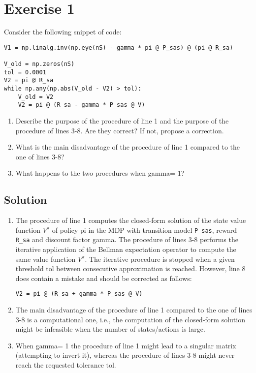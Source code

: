 \section{Exercise 1}

Consider the following snippet of code:
\begin{verbatim}
V1 = np.linalg.inv(np.eye(nS) - gamma * pi @ P_sas) @ (pi @ R_sa)

V_old = np.zeros(nS)
tol = 0.0001
V2 = pi @ R_sa
while np.any(np.abs(V_old - V2) > tol):
    V_old = V2
    V2 = pi @ (R_sa - gamma * P_sas @ V)
\end{verbatim}
\begin{enumerate}
    \item Describe the purpose of the procedure of line 1 and the purpose of the procedure of lines 3-8. 
        Are they correct? 
        If not, propose a correction.
    \item What is the main disadvantage of the procedure of line 1 compared to the one of lines 3-8?
    \item What happens to the two procedures when gamma= 1?
\end{enumerate}

\subsection*{Solution}
\begin{enumerate}
    \item The procedure of line 1 computes the closed-form solution of the state value function $V^\pi$ of policy pi in the MDP with transition model \texttt{P\_sas}, reward \texttt{R_sa} and discount factor gamma. 
        The procedure of lines 3-8 performs the iterative application of the Bellman expectation operator to compute the same value function $V^\pi$. 
        The iterative procedure is stopped when a given threshold tol between consecutive approximation is reached. 
        However, line 8 does contain a mistake and should be corrected as follows:
        \begin{verbatim}
V2 = pi @ (R_sa + gamma * P_sas @ V)
        \end{verbatim}
    \item The main disadvantage of the procedure of line 1 compared to the one of lines 3-8 is a computational one, i.e., the computation of the closed-form solution might be infeasible when the number of states/actions is large.
    \item When gamma= 1 the procedure of line 1 might lead to a singular matrix (attempting to invert it), whereas the procedure of lines 3-8 might never reach the requested tolerance tol.
\end{enumerate}